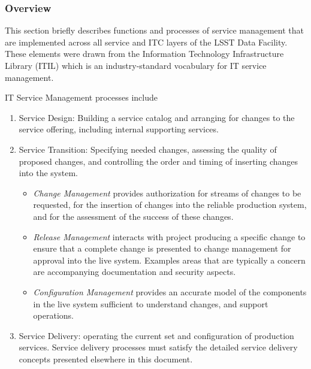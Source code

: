 \subsubsection{Overview}
This section briefly describes functions and processes of service
management that are implemented across all service and ITC layers of
the LSST Data Facility. These elements were drawn from the Information
Technology Infrastructure Library (ITIL) which is an industry-standard
vocabulary for IT service management.

IT Service Management processes include

\begin{enumerate}

\item Service Design: Building a service catalog and arranging for changes to the service offering, including internal supporting services.

\item Service Transition: Specifying needed changes, assessing the quality of proposed changes,
and controlling the order and timing of inserting changes into the system.

  \begin{itemize}
 
  \item \emph{Change Management} provides authorization for streams of changes to be requested, for the insertion of changes into the reliable production system, and for the assessment of the success of these changes.

  \item \emph{Release Management} interacts with project producing a specific change to ensure that
a complete change is presented to change management for approval into the live system. Examples areas that are typically a concern are accompanying documentation and security aspects.

  \item \emph{Configuration Management} provides an accurate model of the components in the live system sufficient to understand changes, and support operations.
 
  \end{itemize}

\item Service Delivery: operating the current set and configuration of production services. Service delivery processes must satisfy the detailed service delivery concepts presented elsewhere in this document.

  \begin{itemize}
  

\end{itemize}
\end{enumerate}
